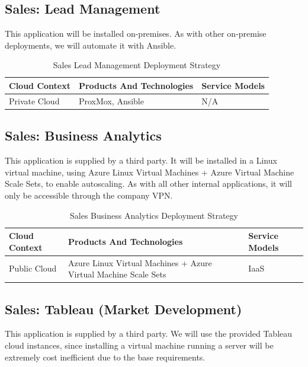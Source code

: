 \documentclass{llncs}
\begin{document}
\subsection{Sales: Lead Management}
This application will be installed on-premises. As with other on-premise deployments, we will automate it with Ansible.
\begin{table}[h!]
    \centering
    \begin{tabular}{lll}
        \hline
        \textbf{Cloud Context} & \textbf{Products And Technologies} & \textbf{Service Models} \\
        \hline
 Private Cloud          & ProxMox, Ansible                   & N/A                     \\
        \hline
    \end{tabular}
    \caption{Sales Lead Management Deployment Strategy}
\end{table}

\subsection{Sales: Business Analytics}
This application is supplied by a third party. It will be installed in a Linux virtual machine, using Azure Linux Virtual Machines + Azure Virtual Machine Scale Sets, to enable autoscaling.
As with all other internal applications, it will only be accessible through the company VPN.\\

\begin{table}[h!]
    \centering
    \begin{tabular}{lll}
        \hline
        \textbf{Cloud Context} & \textbf{Products And Technologies}                              & \textbf{Service Models} \\
        \hline
 Public Cloud           & Azure Linux Virtual Machines + Azure Virtual Machine Scale Sets & IaaS                    \\
    \end{tabular}
    \caption{Sales Business Analytics Deployment Strategy}
\end{table}

\subsection{Sales: Tableau (Market Development)}
This application is supplied by a third party.
We will use the provided Tableau cloud instances, since installing a virtual machine running a server will be extremely cost inefficient due to the base requirements.  \\
\end{document}
